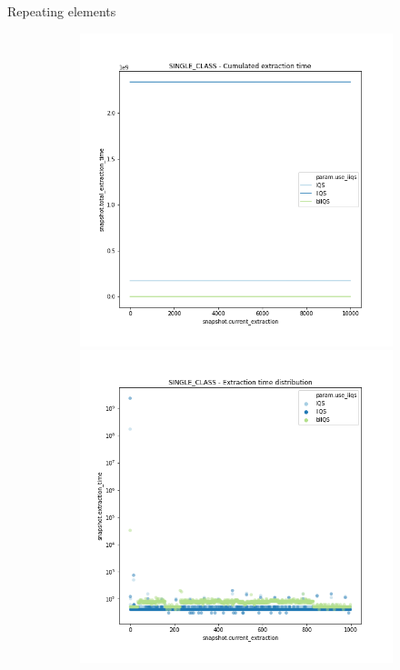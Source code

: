 \documentclass{beamer}
\begin{document}
\begin{frame}{Repeating elements}
    \begin{figure}
        \centering
        \begin{subfigure}[b]{\textwidth}
            \centering
            \includegraphics[height=0.4\textheight]{chapter5/01-basebenchmark-04-single-class.png.0-0.png}
            \includegraphics[height=0.4\textheight]{chapter5/01-basebenchmark-04-single-class.png.1-1.png}

\end{subfigure}
\end{figure}
\end{frame}
\end{document}
